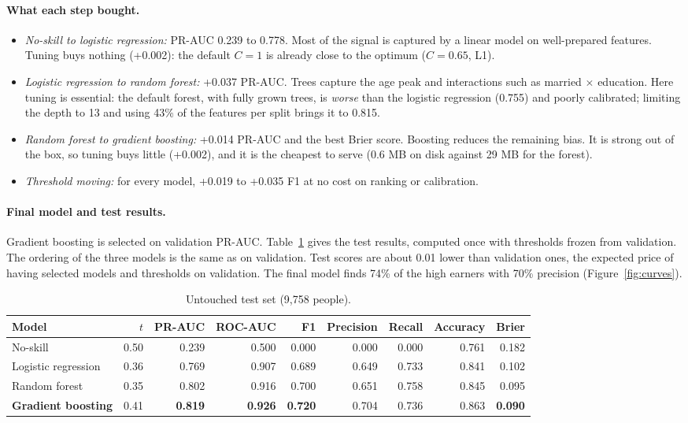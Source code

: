 \documentclass[11pt,a4paper]{article}
\begin{document}
\paragraph{What each step bought.}
\begin{itemize}
\item \emph{No-skill to logistic regression:} PR-AUC 0.239 to 0.778. Most of the signal is captured
by a linear model on well-prepared features. Tuning buys nothing (+0.002): the default $C=1$ is
already close to the optimum ($C=0.65$, L1).
\item \emph{Logistic regression to random forest:} +0.037 PR-AUC. Trees capture the age peak and
interactions such as married $\times$ education. Here tuning is essential: the default forest,
with fully grown trees, is \emph{worse} than the logistic regression (0.755) and poorly calibrated;
limiting the depth to 13 and using 43\% of the features per split brings it to 0.815.
\item \emph{Random forest to gradient boosting:} +0.014 PR-AUC and the best Brier score. Boosting
reduces the remaining bias. It is strong out of the box, so tuning buys little (+0.002), and it is
the cheapest to serve (0.6 MB on disk against 29 MB for the forest).
\item \emph{Threshold moving:} for every model, +0.019 to +0.035 F1 at no cost on ranking or calibration.
\end{itemize}

\paragraph{Final model and test results.} Gradient boosting is selected on validation PR-AUC.
Table~\ref{tab:test} gives the test results, computed once with thresholds frozen from validation.
The ordering of the three models is the same as on validation. Test scores are about 0.01 lower
than validation ones, the expected price of having selected models and thresholds on validation.
The final model finds 74\% of the high earners with 70\% precision (Figure~\ref{fig:curves}).

\begin{table}[H]\centering\small
\begin{tabular}{lrrrrrrrr}\toprule
Model & $t$ & PR-AUC & ROC-AUC & F1 & Precision & Recall & Accuracy & Brier\\\midrule
No-skill & 0.50 & 0.239 & 0.500 & 0.000 & 0.000 & 0.000 & 0.761 & 0.182\\
Logistic regression & 0.36 & 0.769 & 0.907 & 0.689 & 0.649 & 0.733 & 0.841 & 0.102\\
Random forest & 0.35 & 0.802 & 0.916 & 0.700 & 0.651 & 0.758 & 0.845 & 0.095\\
\textbf{Gradient boosting} & 0.41 & \textbf{0.819} & \textbf{0.926} & \textbf{0.720} & 0.704 & 0.736 & 0.863 & \textbf{0.090}\\\bottomrule
\end{tabular}
\caption{Untouched test set (9,758 people).}\label{tab:test}
\end{table}
\end{document}
